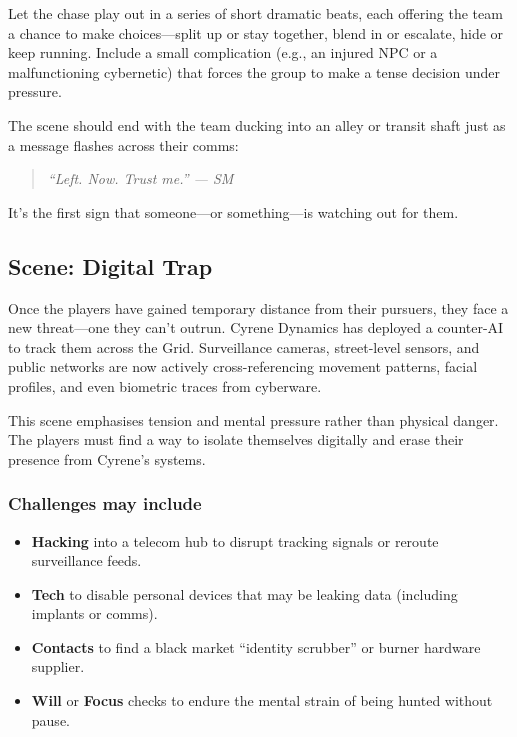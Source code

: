 \documentclass[nodeprecatedcode,bg=print]{dndbook}
\begin{document}
\begin{multicols}{2}

\begin{GmTips}
    Let the chase play out in a series of short dramatic beats, each offering the team a chance to make choices—split up or stay together, blend in or escalate, hide or keep running. Include a small complication (e.g., an injured NPC or a malfunctioning cybernetic) that forces the group to make a tense decision under pressure.
\end{GmTips}

The scene should end with the team ducking into an alley or transit shaft just as a message flashes across their comms:

\vspace{0.5\baselineskip}
\begin{quote}
\textit{“Left. Now. Trust me.” — SM}
\end{quote}
\vspace{0.5\baselineskip}

It’s the first sign that someone—or something—is watching out for them.


\subsection*{Scene: Digital Trap}

Once the players have gained temporary distance from their pursuers, they face a new threat—one they can’t outrun. Cyrene Dynamics has deployed a counter-AI to track them across the Grid. Surveillance cameras, street-level sensors, and public networks are now actively cross-referencing movement patterns, facial profiles, and even biometric traces from cyberware.

This scene emphasises tension and mental pressure rather than physical danger. The players must find a way to isolate themselves digitally and erase their presence from Cyrene’s systems.

\subsubsection{Challenges may include}
\begin{itemize}
    \item \textbf{Hacking} into a telecom hub to disrupt tracking signals or reroute surveillance feeds.
    \item \textbf{Tech} to disable personal devices that may be leaking data (including implants or comms).
    \item \textbf{Contacts} to find a black market “identity scrubber” or burner hardware supplier.
    \item \textbf{Will} or \textbf{Focus} checks to endure the mental strain of being hunted without pause.
\end{itemize}


\end{multicols}
\end{document}
